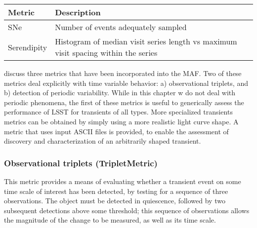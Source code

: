 \begin{center}
\begin{tabular}{| p{5cm} |p{10cm} |}
\hline Metric & Description\\ \hline SNe & Number of events adequately
sampled\\ Serendipity & Histogram of median visit series length vs
maximum visit spacing within the series\\ \hline \end{tabular}
 \end{center}




\citet{2015arXiv150803175L} discuss
three metrics that have been incorporated into the MAF. Two of these
metrics deal explicitly with time variable behavior: a) observational
triplets, and b) detection of periodic variability. While in this
chapter w do not deal with periodic phenomena, the first of these
metrics is useful to generically assess the performance of LSST for
transients of all types. More specialized transients metrics can be
obtained by simply using a more realistic light curve shape. A metric
that uses input ASCII files is provided, to enable the assessment of
discovery and characterization of an arbitrarily shaped transient.

\subsubsection{Observational triplets (TripletMetric)}

This metric provides a means of evaluating whether a transient event
on some time scale of interest has been detected, by testing for a
sequence of three observations. The object must be detected in
quiescence, followed by two subsequent detections above some
threshold; this sequence of observations allows the magnitude of the
change to be measured, as well as its time scale.

